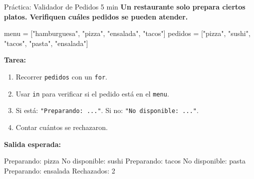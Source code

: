 \documentclass[aspectratio=169, 11pt]{beamer}
\begin{document}
\begin{frame}[fragile,shrink=30]{Práctica: Validador de Pedidos \hfill {\normalsize\color{arcaRed}\faClock\hspace{4pt}5 min}}
  \vspace{-6pt}
  {\small\color{arcaDark}\bfseries
    Un restaurante solo prepara ciertos platos.
    Verifiquen cuáles pedidos se pueden atender.}

  \vspace{4pt}
  \begin{pyblock}
menu = ["hamburguesa", "pizza", "ensalada", "tacos"]
pedidos = ["pizza", "sushi", "tacos", "pasta", "ensalada"]
  \end{pyblock}

  \vspace{3pt}
  {\footnotesize\color{textMuted}
    \textbf{Tarea:}
    \begin{enumerate}\setlength{\itemsep}{2pt}
      \item Recorrer \texttt{pedidos} con un \texttt{for}.
      \item Usar \texttt{in} para verificar si el pedido está en el \texttt{menu}.
      \item Si está: \texttt{"Preparando: ..."}. Si no: \texttt{"No disponible: ..."}.
      \item Contar cuántos se rechazaron.
    \end{enumerate}
  }

  \vspace{3pt}
  {\footnotesize\color{arcaDark}\bfseries Salida esperada:}
  \begin{outputblock}
Preparando: pizza
No disponible: sushi
Preparando: tacos
No disponible: pasta
Preparando: ensalada
Rechazados: 2
  \end{outputblock}
\end{frame}
\end{document}
